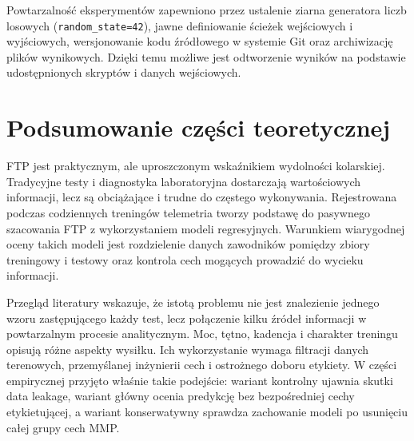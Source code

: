 Powtarzalność eksperymentów zapewniono przez ustalenie ziarna generatora liczb losowych (\texttt{random\_state=42}), jawne definiowanie ścieżek wejściowych i wyjściowych, wersjonowanie kodu źródłowego w systemie Git oraz archiwizację plików wynikowych. Dzięki temu możliwe jest odtworzenie wyników na podstawie udostępnionych skryptów i danych wejściowych.

\section{Podsumowanie części teoretycznej}

FTP jest praktycznym, ale uproszczonym wskaźnikiem wydolności kolarskiej. Tradycyjne testy i diagnostyka laboratoryjna dostarczają wartościowych informacji, lecz są obciążające i trudne do częstego wykonywania. Rejestrowana podczas codziennych treningów telemetria tworzy podstawę do pasywnego szacowania FTP z wykorzystaniem modeli regresyjnych. Warunkiem wiarygodnej oceny takich modeli jest rozdzielenie danych zawodników pomiędzy zbiory treningowy i testowy oraz kontrola cech mogących prowadzić do wycieku informacji.

Przegląd literatury wskazuje, że istotą problemu nie jest znalezienie jednego wzoru zastępującego każdy test, lecz połączenie kilku źródeł informacji w powtarzalnym procesie analitycznym. Moc, tętno, kadencja i charakter treningu opisują różne aspekty wysiłku. Ich wykorzystanie wymaga filtracji danych terenowych, przemyślanej inżynierii cech i ostrożnego doboru etykiety. W części empirycznej przyjęto właśnie takie podejście: wariant kontrolny ujawnia skutki data leakage, wariant główny ocenia predykcję bez bezpośredniej cechy etykietującej, a wariant konserwatywny sprawdza zachowanie modeli po usunięciu całej grupy cech MMP.
